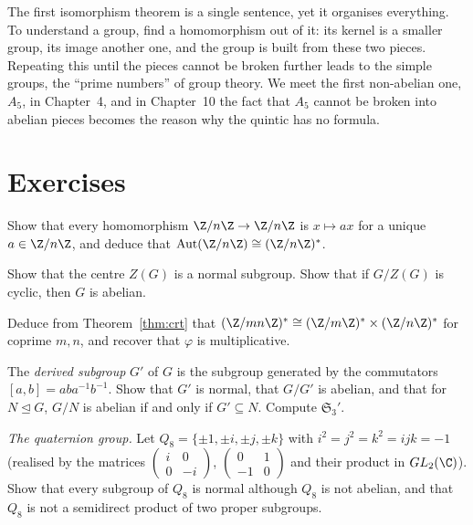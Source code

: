 \begin{beauty}
The first isomorphism theorem is a single sentence, yet it organises everything. To understand a group, find a homomorphism out of it: its kernel is a smaller group, its image another one, and the group is built from these two pieces. Repeating this until the pieces cannot be broken further leads to the simple groups, the ``prime numbers'' of group theory. We meet the first non-abelian one, $A_5$, in Chapter~4, and in Chapter~10 the fact that $A_5$ cannot be broken into abelian pieces becomes the reason why the quintic has no formula.
\end{beauty}

\section{Exercises}

\begin{exercise}[$\star$]\label{ex:autzn}
Show that every homomorphism $\Z/n\Z\to\Z/n\Z$ is $x\mapsto ax$ for a unique $a\in\Z/n\Z$, and deduce that $\operatorname{Aut}(\Z/n\Z)\cong(\Z/n\Z)^*$.
\end{exercise}

\begin{exercise}[$\star$]\label{ex:centre}
Show that the centre $Z(G)$ is a normal subgroup. Show that if $G/Z(G)$ is cyclic, then $G$ is abelian.
\end{exercise}

\begin{exercise}[$\star$]\label{ex:phimult}
Deduce from Theorem~\ref{thm:crt} that $(\Z/mn\Z)^*\cong(\Z/m\Z)^*\times(\Z/n\Z)^*$ for coprime $m,n$, and recover that $\varphi$ is multiplicative.
\end{exercise}

\begin{exercise}[$\star\star$]\label{ex:commutator}
The \emph{derived subgroup} $G'$ of $G$ is the subgroup generated by the commutators $[a,b]=aba^{-1}b^{-1}$. Show that $G'$ is normal, that $G/G'$ is abelian, and that for $N\trianglelefteq G$, $G/N$ is abelian if and only if $G'\subseteq N$. Compute $\mathfrak S_3'$.
\end{exercise}

\begin{exercise}[$\star\star$]\label{ex:quaternion}
\emph{The quaternion group.} Let $Q_8=\{\pm1,\pm i,\pm j,\pm k\}$ with $i^2=j^2=k^2=ijk=-1$ (realised by the matrices $\begin{pmatrix}i&0\\0&-i\end{pmatrix}$, $\begin{pmatrix}0&1\\-1&0\end{pmatrix}$ and their product in $GL_2(\C)$). Show that every subgroup of $Q_8$ is normal although $Q_8$ is not abelian, and that $Q_8$ is not a semidirect product of two proper subgroups.
\end{exercise}

